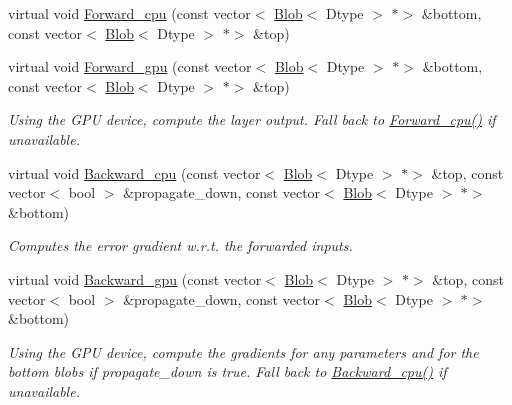 \begin{DoxyCompactItemize}
\item 
virtual void \mbox{\hyperlink{classcaffe_1_1_filter_layer_a67a110cc4062500dcfdb539e3ba9154b}{Forward\+\_\+cpu}} (const vector$<$ \mbox{\hyperlink{classcaffe_1_1_blob}{Blob}}$<$ Dtype $>$ $\ast$$>$ \&bottom, const vector$<$ \mbox{\hyperlink{classcaffe_1_1_blob}{Blob}}$<$ Dtype $>$ $\ast$$>$ \&top)
\item 
\mbox{\label{classcaffe_1_1_filter_layer_ae533ee2002b14016ee57daf7a9f6e8d6}} 
virtual void \mbox{\hyperlink{classcaffe_1_1_filter_layer_ae533ee2002b14016ee57daf7a9f6e8d6}{Forward\+\_\+gpu}} (const vector$<$ \mbox{\hyperlink{classcaffe_1_1_blob}{Blob}}$<$ Dtype $>$ $\ast$$>$ \&bottom, const vector$<$ \mbox{\hyperlink{classcaffe_1_1_blob}{Blob}}$<$ Dtype $>$ $\ast$$>$ \&top)
\begin{DoxyCompactList}\small\item\em Using the G\+PU device, compute the layer output. Fall back to \mbox{\hyperlink{classcaffe_1_1_filter_layer_a67a110cc4062500dcfdb539e3ba9154b}{Forward\+\_\+cpu()}} if unavailable. \end{DoxyCompactList}\item 
virtual void \mbox{\hyperlink{classcaffe_1_1_filter_layer_a11e002d2b3294ca185a01c007995711d}{Backward\+\_\+cpu}} (const vector$<$ \mbox{\hyperlink{classcaffe_1_1_blob}{Blob}}$<$ Dtype $>$ $\ast$$>$ \&top, const vector$<$ bool $>$ \&propagate\+\_\+down, const vector$<$ \mbox{\hyperlink{classcaffe_1_1_blob}{Blob}}$<$ Dtype $>$ $\ast$$>$ \&bottom)
\begin{DoxyCompactList}\small\item\em Computes the error gradient w.\+r.\+t. the forwarded inputs. \end{DoxyCompactList}\item 
\mbox{\label{classcaffe_1_1_filter_layer_a3114666280a8c406779753525c4846c7}} 
virtual void \mbox{\hyperlink{classcaffe_1_1_filter_layer_a3114666280a8c406779753525c4846c7}{Backward\+\_\+gpu}} (const vector$<$ \mbox{\hyperlink{classcaffe_1_1_blob}{Blob}}$<$ Dtype $>$ $\ast$$>$ \&top, const vector$<$ bool $>$ \&propagate\+\_\+down, const vector$<$ \mbox{\hyperlink{classcaffe_1_1_blob}{Blob}}$<$ Dtype $>$ $\ast$$>$ \&bottom)
\begin{DoxyCompactList}\small\item\em Using the G\+PU device, compute the gradients for any parameters and for the bottom blobs if propagate\+\_\+down is true. Fall back to \mbox{\hyperlink{classcaffe_1_1_filter_layer_a11e002d2b3294ca185a01c007995711d}{Backward\+\_\+cpu()}} if unavailable. \end{DoxyCompactList}\item 

\end{DoxyCompactItemize}
